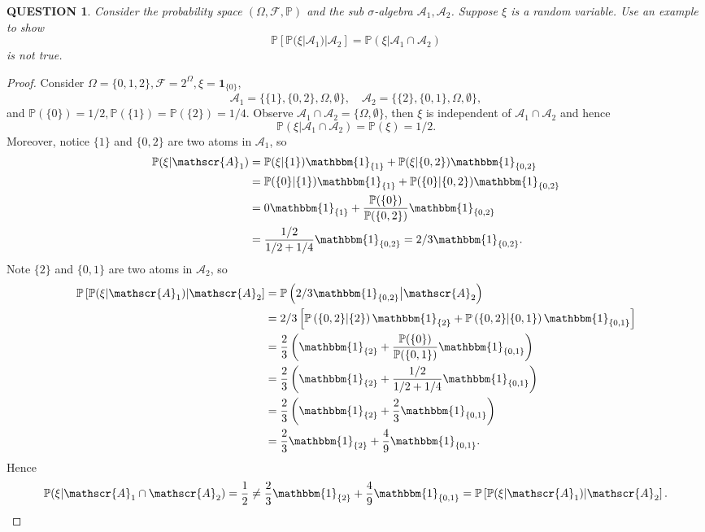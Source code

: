 \documentclass[12pt]{article}
\renewcommand{\i}{\bm{1}}
\renewcommand{\(}{\left(}%
\renewcommand{\)}{\right)}%
\renewcommand{\[}{\left[}%
\renewcommand{\]}{\right]}%
\renewcommand{\a}{\mathscr{A}}
\newcommand{\p}{\mathbb{P}}
\newcommand{\f}{\mathscr{F}}
\newtheorem{question}{QUESTION}[section]}
\newtheorem{proof}{Proof.}}
\begin{document}
  \begin{question}
   Consider the probability space $(\Omega,\f,\p)$ and the sub $\sigma$-algebra $\a_1,\a_2$. Suppose $\xi$ is a random variable. Use an example to show
   \begin{equation*}
    \p\[\p(\xi|\a_1 )|\a_2\]=\p(\xi|\a_1\cap\a_2 )
   \end{equation*}
   is not true.
  \end{question}
  \begin{proof}
   Consider $\Omega=\{0,1,2\},\f=2^\Omega,\xi=\i_{\{0\}}$,
   \begin{equation*}
    \a_1=\{\{1\},\{0,2\},\Omega ,\emptyset \},\quad \a_2=\{\{2\},\{0,1\},\Omega ,\emptyset \},
   \end{equation*}
   and $\p(\{0\})=1/2,\p(\{1\})=\p(\{2\})=1/4$. Observe $\a_1\cap\a_2=\{\Omega,\emptyset \}$, then $\xi$ is independent of $\a_1\cap \a_2$ and hence
   \begin{equation*}
    \p(\xi|\a_1\cap\a_2)=\p(\xi)=1/2.
   \end{equation*}
   Moreover, notice $\{1\}$ and $\{0,2\}$ are two atoms in $\a_1$, so
   \begin{equation*}
    \begin{split}
     \p(\xi|\a_1)&=\p(\xi|\{1\} )\mathbbm{1}_{\{1\}}+\p(\xi|\{0,2\})\mathbbm{1}_{\{0,2\}}\\
     &=\p(\{0\}|\{1\})\mathbbm{1}_{\{1\}}+\p(\{0\}|\{0,2\} )\mathbbm{1}_{\{0,2\}}\\
     &=0\mathbbm{1}_{\{1\}}+\frac{\p(\{0\})}{\p(\{0,2\})}\mathbbm{1}_{\{0,2\}}\\
     &=\frac{1/2}{1/2+1/4}\mathbbm{1}_{\{0,2\}}=2/3\mathbbm{1}_{\{0,2\}}.
    \end{split}
   \end{equation*}
   Note $\{2 \}$ and $\{0,1\}$ are two atoms in $\a_2$, so
   \begin{equation*}
    \begin{split}
     \p\[\p(\xi|\a_1 )|\a_2\]&=\p\(2/3\mathbbm{1}_{\{0,2\}}\big|\a_2 \)\\
     &=2/3\[\p\(\{0,2\}|\{2\} \)\mathbbm{1}_{\{2\}}+\p\(\{0,2\}|\{0,1\} \)\mathbbm{1}_{\{0,1\}}\]\\
     &=\frac{2}{3} \(\mathbbm{1}_{\{2\}}+\frac{\p(\{0\})}{\p(\{0,1\})}\mathbbm{1}_{\{0,1\}} \)\\
     &=\frac{2}{3} \(\mathbbm{1}_{\{2\}}+\frac{1/2}{1/2+1/4}\mathbbm{1}_{\{0,1\}} \)\\
     &=\frac{2}{3} \(\mathbbm{1}_{\{2\}}+\frac{2}{3}\mathbbm{1}_{\{0,1\}} \)\\
     &=\frac{2}{3} \mathbbm{1}_{\{2\}}+\frac{4}{9}\mathbbm{1}_{\{0,1\}}.
    \end{split}
   \end{equation*}
   Hence
   \begin{equation*}
    \p(\xi|\a_1\cap\a_2)=\frac{1}{2}\neq \frac{2}{3} \mathbbm{1}_{\{2\}}+\frac{4}{9}\mathbbm{1}_{\{0,1\}}=\p\[\p(\xi|\a_1 )|\a_2\].
   \end{equation*}
  \end{proof}
\end{document}
